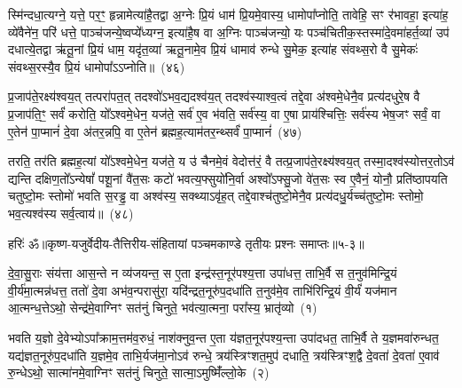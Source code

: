 स्मि॑न्दधा॒त्यग्ने॒ यत्ते॒ पर॒ꣳ॒ हृन्नामेत्या॑है॒तद्वा अ॒ग्नेः प्रि॒यं धाम॑ प्रि॒यमे॒वास्य॒ धामोपा᳚प्नोति॒ तावेहि॒ सꣳ र॑भावहा॒ इत्या॑ह॒ व्ये॑वैने॑न॒ परि॑ धत्ते॒ पाञ्च॑जन्ये॒ष्वप्ये᳚ध्यग्न॒ इत्या॑है॒ष वा अ॒ग्निः पाञ्च॑जन्यो॒ यः पञ्च॑चितीक॒स्तस्मा॑दे॒वमा॑हर्त॒व्या॑ उप॑ दधात्ये॒तद्वा ऋ॑तू॒नां प्रि॒यं धाम॒ यदृ॑त॒व्या॑ ऋतू॒नामे॒व प्रि॒यं धामाव॑ रुन्धे सु॒मेक॒ इत्या॑ह संवथ्स॒रो वै सु॒मेकः॑ संवथ्स॒रस्यै॒व प्रि॒यं धामोपा᳚ऽऽप्नोति॥~(४६)\ip

{\anuvakamend[{अभ॑व॒न्नायु॑रे॒वर्त॒व्या॑ उप॒ षड्विꣳ॑शतिश्च}]}%

प्र॒जा\-प॑ते॒रक्ष्य॑श्वय॒त् तत्परा॑पत॒त् तदश्वो॑\-ऽभव॒द्यदश्व॑य॒त् तदश्व॑स्याश्व॒त्वं तद्दे॒वा अ॑श्वमे॒धेनै॒व प्रत्य॑दधुरे॒ष वै प्र॒जा\-प॑ति॒ꣳ॒ सर्वं॑ करोति॒ यो᳚\-ऽश्वमे॒धेन॒ यज॑ते॒ सर्व॑ ए॒व भ॑वति॒ सर्व॑स्य॒ वा ए॒षा प्राय॑श्चित्तिः॒ सर्व॑स्य भेष॒जꣳ सर्वं॒ वा ए॒तेन॑ पा॒प्मानं॑ दे॒वा अ॑तर॒न्नपि॒ वा ए॒तेन॑ ब्रह्मह॒त्याम॑तर॒न्थ्सर्वं॑ पा॒प्मानं॑~(४७)\ip

तरति॒ तर॑ति ब्रह्मह॒त्यां यो᳚\-ऽश्वमे॒धेन॒ यज॑ते॒ य उ॑ चैनमे॒वं वेदोत्त॑रं॒ वै तत्प्र॒जा\-प॑ते॒रक्ष्य॑श्वय॒त् तस्मा॒दश्व॑स्योत्तर॒तो\-ऽव॑ द्यन्ति दक्षिण॒तो᳚\-ऽन्येषां᳚ पशू॒नां वै॑त॒सः कटो॑ भवत्य॒फ्सुयो॑नि॒र्वा अश्वो᳚\-ऽफ्सु॒जो वे॑त॒सः स्व ए॒वैनं॒ योनौ॒ प्रति॑\-ष्ठापयति चतुष्टो॒मः स्तोमो॑ भवति स॒रड्ढ॒ वा अश्व॑स्य॒ सक्थ्या\-ऽवृ॑ह॒त् तद्दे॒वाश्च॑तुष्टो॒मेनै॒व प्रत्य॑दधु॒र्यच्च॑तुष्टो॒मः स्तोमो॒ भव॒त्यश्व॑स्य सर्व॒त्वाय॑॥~(४८)\ip

{\anuvakamend[{सर्वं॑ पा॒प्मान॑मवृह॒द्द्वाद॑श च}]}%

{हरिः॑ ॐ}{॥कृष्ण-यजुर्वेदीय-तैत्तिरीय-संहितायां पञ्चमकाण्डे तृतीयः प्रश्नः समाप्तः॥५-३॥}



\setcounter{anuvakam}{0}
दे॒वा॒सु॒राः संय॑त्ता आस॒न्ते न व्य॑जयन्त॒ स ए॒ता इन्द्र॑स्त॒नूर॑पश्य॒त्ता उपा॑धत्त॒ ताभि॒र्वै स त॒नुव॑मिन्द्रि॒यं वी॒र्य॑मा॒त्मन्न॑धत्त॒ ततो॑ दे॒वा अभ॑व॒न्परासु॑रा॒ यदि॑न्द्रत॒नूरु॑प॒\-दधा॑ति त॒नुव॑मे॒व ताभि॑रिन्द्रि॒यं वी॒र्यं॑ यज॑मान आ॒त्मन्ध॒त्ते\-ऽथो॒ सेन्द्र॑मे॒वाग्निꣳ सत॑नुं चिनुते॒ भव॑त्या॒त्मना॒ परा᳚स्य॒ भ्रातृ॑व्यो~(१)\ip

भवति य॒ज्ञो दे॒वेभ्यो\-ऽपा᳚क्राम॒त्तम॑व॒रुधं॒ नाश॑क्नुव॒न्त ए॒ता य॑ज्ञत॒नूर॑पश्य॒न्ता उपा॑दधत॒ ताभि॒र्वै ते य॒ज्ञमवा॑रुन्धत॒ यद्य॑ज्ञत॒नूरु॑प॒\-दधा॑ति य॒ज्ञमे॒व ताभि॒र्यज॑मा॒नो\-ऽव॑ रुन्धे॒ त्रय॑स्त्रिꣳशत॒मुप॑ दधाति॒ त्रय॑स्त्रिꣳश॒द्वै दे॒वता॑ दे॒वता॑ ए॒वाव॑ रु॒न्धे\-ऽथो॒ सात्मा॑नमे॒वाग्निꣳ सत॑नुं चिनुते॒ सात्मा॒\-ऽमुष्मिँ॑ल्लो॒के~(२)\ip


